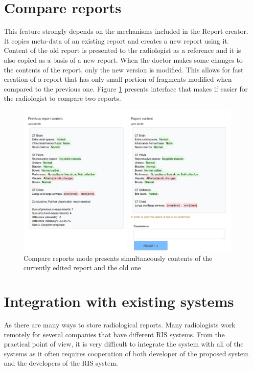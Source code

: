 \documentclass[12pt, twoside, openany]{report}
\theoremstyle{definition}
\begin{document}
\section{Compare reports}
This feature strongly depends on the mechanisms included in the Report creator. It copies meta-data of an existing report and creates a new report using it. Content of the old report is presented to the radiologist as a reference and it is also copied as a basis of a new report. When the doctor makes some changes to the contents of the report, only the new version is modified. This allows for fast creation of a report that has only small portion of fragments modified when compared to the previous one.
Figure \ref{fig:compare-report} presents interface that makes if easier for the radiologist to compare two reports.

\begin{figure}
	\centering
	\includegraphics[width=\linewidth]{compare-reports}
	\caption{Compare reports mode presents simultaneously contents of the currently edited report and the old one
		\label{fig:compare-report}
	}
\end{figure}

\section{Integration with existing systems}
As there are many ways to store radiological reports. Many radiologists work remotely for several companies that have different RIS systems. From the practical point of view, it is very difficult to integrate the system with all of the systems as it often requires cooperation of both developer of the proposed system and the developers of the RIS system. 
\end{document}
